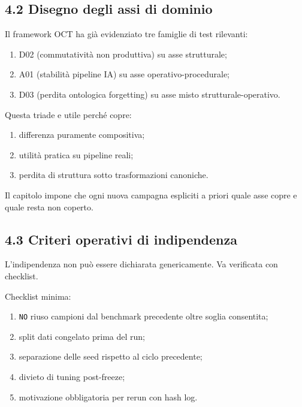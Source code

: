 \subsection{4.2 Disegno degli assi di dominio}

Il framework OCT ha già evidenziato tre famiglie di test rilevanti:

\begin{enumerate}
\def\labelenumi{\arabic{enumi}.}
\tightlist
\item
  D02 (commutatività non produttiva) su asse strutturale;
\item
  A01 (stabilità pipeline IA) su asse operativo-procedurale;
\item
  D03 (perdita ontologica forgetting) su asse misto strutturale-operativo.
\end{enumerate}

Questa triade e utile perché copre:

\begin{enumerate}
\def\labelenumi{\arabic{enumi}.}
\tightlist
\item
  differenza puramente compositiva;
\item
  utilità pratica su pipeline reali;
\item
  perdita di struttura sotto trasformazioni canoniche.
\end{enumerate}

Il capitolo impone che ogni nuova campagna espliciti a priori quale asse copre e quale resta non coperto.

\subsection{4.3 Criteri operativi di indipendenza}

L'indipendenza non può essere dichiarata genericamente. Va verificata con checklist.

Checklist minima:

\begin{enumerate}
\def\labelenumi{\arabic{enumi}.}
\tightlist
\item
  \texttt{NO} riuso campioni dal benchmark precedente oltre soglia consentita;
\item
  split dati congelato prima del run;
\item
  separazione delle seed rispetto al ciclo precedente;
\item
  divieto di tuning post-freeze;
\item
  motivazione obbligatoria per rerun con hash log.
\end{enumerate}

